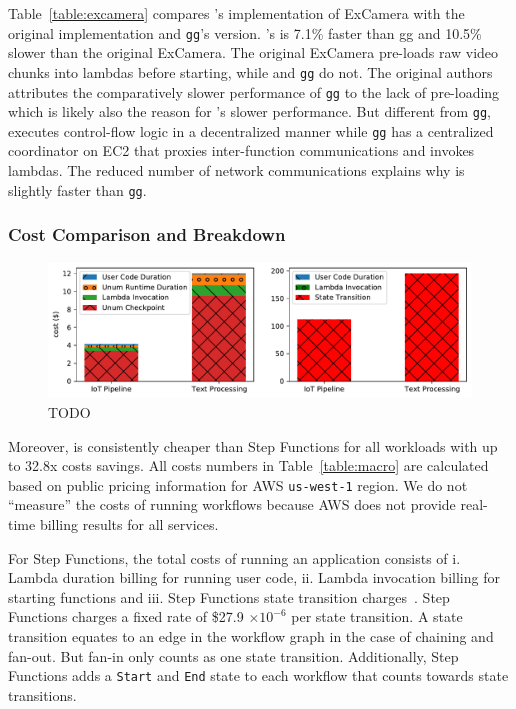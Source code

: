 
Table~\ref{table:excamera} compares \name{}'s implementation of ExCamera with
the original implementation and \texttt{gg}'s version. \name{}'s is 7.1\%
faster than gg and 10.5\% slower than the original ExCamera. The original
ExCamera pre-loads raw video chunks into lambdas before starting, while
\name{} and \texttt{gg} do not. The original authors attributes the
comparatively slower performance of \texttt{gg} to the lack of pre-loading
which is likely also the reason for \name{}'s slower performance. But
different from \texttt{gg}, \name{} executes control-flow logic in a
decentralized manner while \texttt{gg} has a centralized coordinator on EC2
that proxies inter-function communications and invokes lambdas. The reduced
number of network communications  explains why \name{} is slightly
faster than \texttt{gg}.


\subsubsection{Cost Comparison and Breakdown}

\begin{figure}[t!]
    \centering
    \includegraphics[width=\columnwidth]{figures/AppCostBreakdown.pdf}
    \caption{TODO}
    \label{fig:cost-breakdown}
\end{figure}

Moreover, \name{} is consistently cheaper than Step Functions for all
workloads with up to 32.8x costs savings. All costs numbers in
Table~\ref{table:macro} are calculated based on public pricing information for
AWS \texttt{us-west-1} region. We do not ``measure'' the costs of running
workflows because AWS does not provide real-time billing results for all
services.

For Step Functions, the total costs of running an application consists of i.
Lambda duration billing for running user code, ii. Lambda invocation billing
for starting functions and iii. Step Functions state transition
charges~\cite{aws-step-functions-pricing}. Step Functions charges a fixed rate
of \$27.9 $ \times 10^{-6}$ per state transition. A state transition equates
to an edge in the workflow graph in the case of chaining and fan-out. But
fan-in only counts as one state transition. Additionally, Step Functions adds
a \texttt{Start} and \texttt{End} state to each workflow that counts towards
state transitions.

